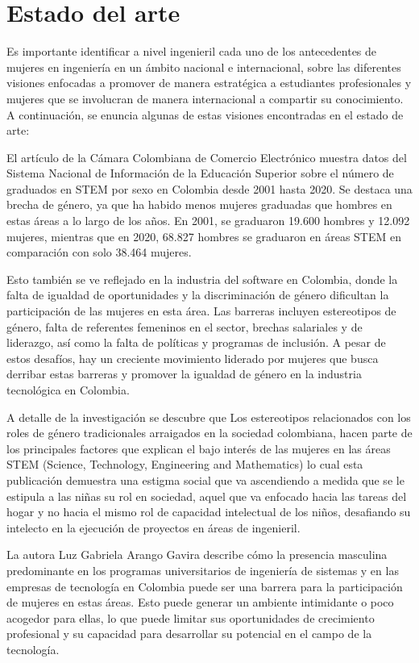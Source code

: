 \documentclass[hidelinks]{Documento}
\begin{document}
\section{Estado del arte}
Es importante identificar a nivel ingenieril cada uno de los antecedentes de mujeres en ingeniería en un ámbito nacional e internacional, sobre las diferentes visiones enfocadas a promover de manera estratégica a estudiantes profesionales y mujeres que se involucran de manera internacional a compartir su conocimiento. A continuación, se enuncia algunas de estas visiones encontradas en el estado de arte:


El artículo de la Cámara Colombiana de Comercio Electrónico muestra datos del Sistema Nacional de Información de la Educación Superior sobre el número de graduados en STEM por sexo en Colombia desde 2001 hasta 2020. Se destaca una brecha de género, ya que ha habido menos mujeres graduadas que hombres en estas áreas a lo largo de los años. En 2001, se graduaron 19.600 hombres y 12.092 mujeres, mientras que en 2020, 68.827 hombres se graduaron en áreas STEM en comparación con solo 38.464 mujeres.

Esto también se ve reflejado en la industria del software en Colombia, donde la falta de igualdad de oportunidades y la discriminación de género dificultan la participación de las mujeres en esta área. Las barreras incluyen estereotipos de género, falta de referentes femeninos en el sector, brechas salariales y de liderazgo, así como la falta de políticas y programas de inclusión. A pesar de estos desafíos, hay un creciente movimiento liderado por mujeres que busca derribar estas barreras y promover la igualdad de género en la industria tecnológica en Colombia.


A detalle de la investigación se descubre que Los estereotipos relacionados con los roles de género tradicionales arraigados en la sociedad colombiana, hacen parte de los principales factores que explican el bajo interés de las mujeres en las áreas STEM (Science, Technology, Engineering and Mathematics)  lo cual esta publicación demuestra una estigma social que va ascendiendo a medida que se le estipula a las niñas su rol en sociedad, aquel que va enfocado hacia las tareas del hogar y no hacia el mismo rol de capacidad intelectual de los niños, desafiando su intelecto en la ejecución de proyectos en áreas de ingenieril. 

La autora Luz Gabriela Arango Gavira  describe cómo la presencia masculina predominante en los programas universitarios de ingeniería de sistemas y en las empresas de tecnología en Colombia puede ser una barrera para la participación de mujeres en estas áreas. Esto puede generar un ambiente intimidante o poco acogedor para ellas, lo que puede limitar sus oportunidades de crecimiento profesional y su capacidad para desarrollar su potencial en el campo de la tecnología. 
\end{document}
